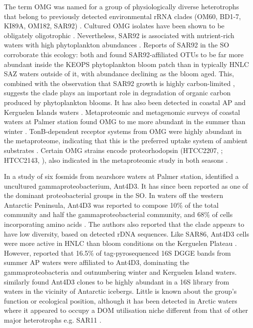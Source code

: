 
The term \ac{OMG} was named for a group of physiologically diverse heterotrophs that belong to previously detected environmental rRNA clades (OM60, BD1-7, KI89A, OM182, SAR92) \cite{Cho:2004gm}.
Cultured \ac{OMG} isolates have been shown to be obligately oligotrophic \cite{Cho:2004gm}.
Nevertheless, SAR92 is associated with nutrient-rich waters with high phytoplankton abundances \cite{Stingl:2007ja,Pinhassi:2004is}.
Reports of SAR92 in the \ac{SO} corroborate this ecology: both \citet{West:2008kc} and \citet{Obernosterer:2011df} found SAR92-affiliated \acp{OTU} to be far more abundant inside the \ac{KEOPS} phytoplankton bloom patch than in typically \ac{HNLC} \ac{SAZ} waters outside of it, with abundance declining as the bloom aged.
This, combined with the observation that SAR92 growth is highly carbon-limited \cite{Stingl:2007ja}, suggests the clade plays an important role in degradation of organic carbon produced by phytoplankton blooms.
It has also been detected in coastal \ac{AP} and Kerguelen Islands waters \cite{Ghiglione:2011ee}.
Metaproteomic and metagenomic surveys of coastal waters at Palmer station found \ac{OMG} to me more abundant in the summer than winter \cite{Williams:2012bs}.
TonB-dependent receptor systems from \ac{OMG} were highly abundant in the metaproteome, indicating that this is the preferred uptake system of ambient substrates \cite{Williams:2012bs}.
Certain \ac{OMG} strains encode proteorhodopsin (HTCC2207, \citet{Stingl:2007ja}; HTCC2143, \citet{Oh:2010di}), also indicated in the metaproteomic study in both seasons \cite{Williams:2012bs}.


In a study of six fosmids from nearshore waters at Palmer station, \cite{Grzymski:2006ds} identified a uncultured gammaproteobacterium, Ant4D3.
It has since been reported as one of the dominant proteobacterial groups in the \ac{SO}.
In waters off the western Antarctic Peninsula, Ant4D3 was reported to compose 10\% of the total community and half the gammaproteobacterial community, and 68\% of cells incorporating amino acids \cite{Straza:2010io}.
The authors also reported that the clade appears to have low diversity, based on detected rDNA sequences.
Like SAR86, Ant4D3 cells were more active in \ac{HNLC} than bloom conditions on the Kerguelen Plateau \cite{West:2008kc}.
However, \cite{Ghiglione:2011ee} reported that 16.5\% of tag-pyrosequenced 16S \ac{DGGE} bands from summer \ac{AP} waters were affiliated to Ant4D3, dominating the gammaproteobacteria and outnumbering winter and Kerguelen Island waters.
\cite{Murray:2011ib} similarly found Ant4D3 clones to be highly abundant in a 16S library from waters in the vicinity of Antarctic icebergs.
Little is known about the group's function or ecological position, although it has been detected in Arctic waters where it appeared to occupy a \ac{DOM} utilisation niche different from that of other major heterotrophs e.g. SAR11 \cite{Nikrad:2012fa}.

